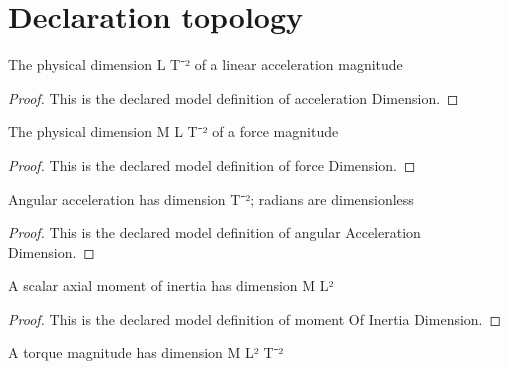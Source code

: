 \section{Declaration topology}
\begin{definition}
  \label{def:physics:phyx-mini-0778:phyxminiproblems-problemphyxmini0778-accelerationdimension}
  The physical dimension L T⁻² of a linear acceleration magnitude
\end{definition}
\begin{proof}
  This is the declared model definition of acceleration Dimension.
\end{proof}
\begin{definition}
  \label{def:physics:phyx-mini-0778:phyxminiproblems-problemphyxmini0778-forcedimension}
  The physical dimension M L T⁻² of a force magnitude
\end{definition}
\begin{proof}
  This is the declared model definition of force Dimension.
\end{proof}
\begin{definition}
  \label{def:physics:phyx-mini-0778:phyxminiproblems-problemphyxmini0778-angularaccelerationdimension}
  Angular acceleration has dimension T⁻²; radians are dimensionless
\end{definition}
\begin{proof}
  This is the declared model definition of angular Acceleration Dimension.
\end{proof}
\begin{definition}
  \label{def:physics:phyx-mini-0778:phyxminiproblems-problemphyxmini0778-momentofinertiadimension}
  A scalar axial moment of inertia has dimension M L²
\end{definition}
\begin{proof}
  This is the declared model definition of moment Of Inertia Dimension.
\end{proof}
\begin{definition}
  \label{def:physics:phyx-mini-0778:phyxminiproblems-problemphyxmini0778-torquedimension}
  A torque magnitude has dimension M L² T⁻²
\end{definition}
